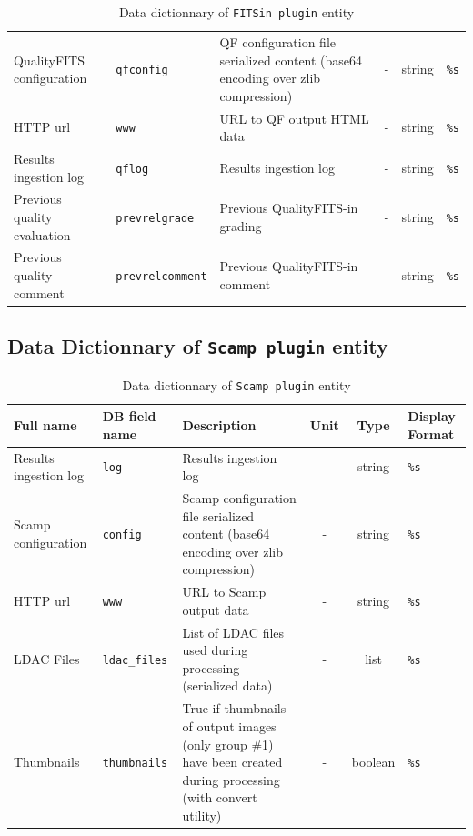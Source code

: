 \documentclass[twoside,a4paper]{article}
\begin{document}
\begin{table}
{\begin{tabular}{|l|l|l|c|c|l|}
QualityFITS configuration & {\tt qfconfig} & QF configuration file serialized content (base64 encoding over zlib compression) & - & string & {\tt \%s}\\
HTTP url & {\tt www} & URL to QF output HTML data & - & string & {\tt \%s}\\
Results ingestion log & {\tt qflog} & Results ingestion log & - & string & {\tt \%s}\\
Previous quality evaluation & {\tt prevrelgrade} & Previous QualityFITS-in grading & - & string & {\tt \%s}\\
Previous quality comment & {\tt prevrelcomment} & Previous QualityFITS-in comment & - & string & {\tt \%s}\\
\hline
\end{tabular}}
\caption{Data dictionnary of {\tt FITSin plugin} entity}
\end{table}

\subsection{Data Dictionnary of {\tt Scamp plugin} entity}
\begin{table}
\centering
\footnotesize{
\begin{tabular}{|l|l|l|c|c|l|}
\hline
Full name & DB field name & Description & Unit & Type & Display Format\\
\hline
Results ingestion log & {\tt log} & Results ingestion log & - & string & {\tt \%s}\\
Scamp configuration & {\tt config} & Scamp configuration file serialized content (base64 encoding over zlib compression) & - & string & {\tt \%s}\\
HTTP url & {\tt www} & URL to Scamp output data & - & string & {\tt \%s}\\
LDAC Files & {\tt ldac\_files} & List of LDAC files used during processing (serialized data) & - & list & {\tt \%s}\\
Thumbnails & {\tt thumbnails} & True if thumbnails of output images (only group \#1) have been created during processing (with convert utility) & - & boolean & {\tt \%s}\\
\hline
\end{tabular}}
\caption{Data dictionnary of {\tt Scamp plugin} entity}
\end{table}

\end{document}
